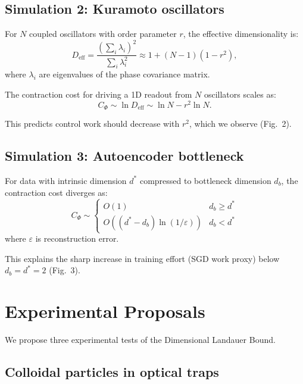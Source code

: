 \documentclass[aps,prx,twocolumn,superscriptaddress,floatfix]{revtex4-2}
\begin{document}
\subsection{Simulation 2: Kuramoto oscillators}

For $N$ coupled oscillators with order parameter $r$, the effective dimensionality is:
\begin{equation}
D_\mathrm{eff} = \frac{(\sum_i \lambda_i)^2}{\sum_i \lambda_i^2} \approx 1 + (N-1)(1-r^2),
\end{equation}
where $\lambda_i$ are eigenvalues of the phase covariance matrix.

The contraction cost for driving a 1D readout from $N$ oscillators scales as:
\begin{equation}
C_\Phi \sim \ln D_\mathrm{eff} \sim \ln N - r^2 \ln N.
\end{equation}

This predicts control work should decrease with $r^2$, which we observe (Fig.~2).

\subsection{Simulation 3: Autoencoder bottleneck}

For data with intrinsic dimension $d^*$ compressed to bottleneck dimension $d_b$, the contraction cost diverges as:
\begin{equation}
C_\Phi \sim \begin{cases}
O(1) & d_b \geq d^* \\
O((d^* - d_b)\ln(1/\varepsilon)) & d_b < d^*
\end{cases}
\end{equation}
where $\varepsilon$ is reconstruction error.

This explains the sharp increase in training effort (SGD work proxy) below $d_b = d^* = 2$ (Fig.~3).

\section{Experimental Proposals}
\label{app:experiments}

We propose three experimental tests of the Dimensional Landauer Bound.

\subsection{Colloidal particles in optical traps}
\end{document}
